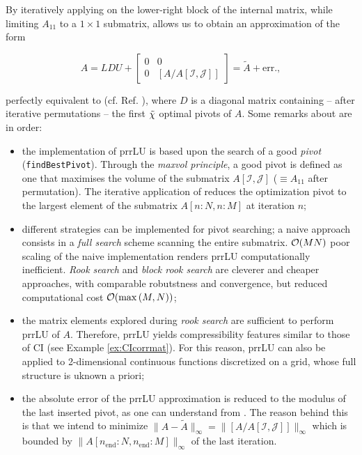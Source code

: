 By iteratively applying  on the lower-right block of the internal matrix, while limiting $A_{11}$ to a $1\times 1$ submatrix,  allows us to obtain an approximation of the form 

\begin{equation}
	\label{eq:prrLUCI}
	A = LDU + \begin{bmatrix}
		0 & 0\\
		0 & [A/A[\mathcal{I}, \mathcal{J}]]
	\end{bmatrix} = \tilde{A} + \textrm{err.},
\end{equation}

perfectly equivalent to  (cf. Ref. \cite{Fernandez2024}), where $D$ is a diagonal matrix containing -- after iterative permutations -- the first ${\tilde \chi}$ optimal pivots of $A$.
Some remarks about  are in order: 
\begin{itemize}
	\item the implementation of prrLU is based upon the search of a good \textit{pivot} (\texttt{findBestPivot}). Through the \textit{maxvol principle}, a good pivot is defined as one that maximises the volume of the submatrix $A[\mathcal{I}, \mathcal{J}]$ ($\equiv A_{11}$ after permutation). The iterative application of  reduces the optimization pivot to the largest element of the submatrix $A[n\!:\!N,n\!:\!M]$ at iteration $n$;
	\item different strategies can be implemented for pivot searching; a naive approach consists in a \textit{full search} scheme scanning the entire submatrix. $\mathcal{O}(MN)$ poor scaling of the naive implementation renders prrLU computationally inefficient. \textit{Rook search} \cite{Poole2000} and \textit{block rook search} \cite{Fernandez2024} are cleverer and cheaper approaches, with comparable robutstness and convergence, but reduced computational cost $\mathcal{O}(\max\left(M,N\right))$;  
	\item the matrix elements explored during \textit{rook search} are sufficient to perform prrLU of $A$. Therefore, prrLU yields compressibility features similar to those of CI (see Example \ref{ex:CIcorrmat}). For this reason, prrLU can also be applied to 2-dimensional continuous functions discretized on a grid, whose full structure is uknown a priori; 	
	\item the absolute error of the prrLU approximation is reduced to the modulus of the last inserted pivot, as one can understand from . The reason behind this is that we intend to minimize $\parallel\! A - \tilde{A}\!\parallel_{\infty} = \parallel\![A/A[\mathcal{I}, \mathcal{J}]] \!\parallel_{\infty}$ which is bounded by $\parallel\! A[n_{\textrm{end}}\!:\!N, n_{\textrm{end}}\!:\!M]\!\parallel_{\infty}$ of the last iteration.  
\end{itemize}


